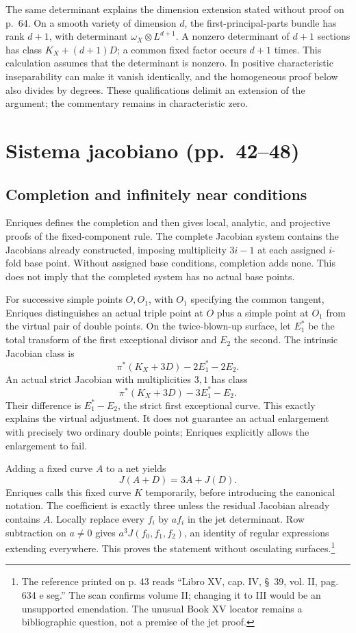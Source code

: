 The same determinant explains the dimension extension stated without proof on p.~64. On a smooth variety of dimension \(d\), the first-principal-parts bundle has rank \(d+1\), with determinant \(\omega_X\otimes L^{d+1}\). A nonzero determinant of \(d+1\) sections has class \(K_X+(d+1)D\); a common fixed factor occurs \(d+1\) times. This calculation assumes that the determinant is nonzero. In positive characteristic inseparability can make it vanish identically, and the homogeneous proof below also divides by degrees. These qualifications delimit an extension of the argument; the commentary remains in characteristic zero.

\section[Sistema jacobiano]{Sistema jacobiano (pp.~42--48)}\label{commentary-II-2}

\subsection{Completion and infinitely near conditions}

Enriques defines the completion and then gives local, analytic, and projective proofs of the fixed-component rule. The complete Jacobian system contains the Jacobians already constructed, imposing multiplicity \(3i-1\) at each assigned \(i\)-fold base point. Without assigned base conditions, completion adds none. This does not imply that the completed system has no actual base points.

For successive simple points \(O,O_1\), with \(O_1\) specifying the common tangent, Enriques distinguishes an actual triple point at \(O\) plus a simple point at \(O_1\) from the virtual pair of double points. On the twice-blown-up surface, let \(E_1^*\) be the total transform of the first exceptional divisor and \(E_2\) the second. The intrinsic Jacobian class is \[
\pi^*(K_X+3D)-2E_1^*-2E_2.
\] An actual strict Jacobian with multiplicities \(3,1\) has class \[
\pi^*(K_X+3D)-3E_1^*-E_2.
\] Their difference is \(E_1^*-E_2\), the strict first exceptional curve. This exactly explains the virtual adjustment. It does not guarantee an actual enlargement with precisely two ordinary double points; Enriques explicitly allows the enlargement to fail.

Adding a fixed curve \(A\) to a net yields \[
J(A+D)=3A+J(D).
\] Enriques calls this fixed curve \(K\) temporarily, before introducing the canonical notation. The coefficient is exactly three unless the residual Jacobian already contains \(A\). Locally replace every \(f_i\) by \(af_i\) in the jet determinant. Row subtraction on \(a\ne0\) gives \(a^3J(f_0,f_1,f_2)\), an identity of regular expressions extending everywhere. This proves the statement without osculating surfaces.\footnote{The reference printed on p. 43 reads ``Libro XV, cap. IV, \S~39, vol. II, pag. 634 e seg.'' The scan confirms volume II; changing it to III would be an unsupported emendation. The unusual Book XV locator remains a bibliographic question, not a premise of the jet proof.}

